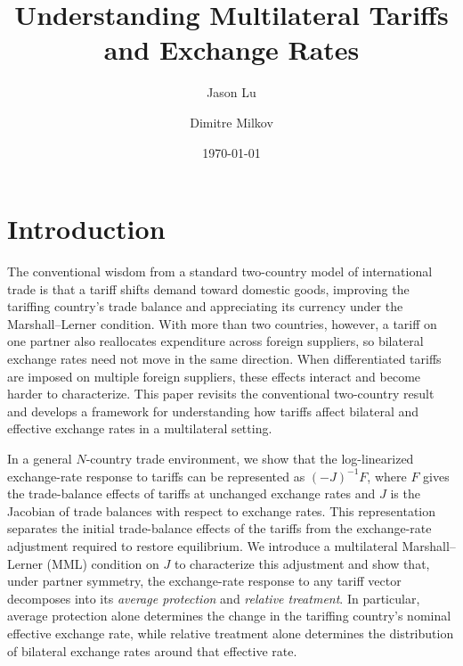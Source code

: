 \documentclass[11pt]{article}
\title{Understanding Multilateral Tariffs and Exchange Rates}
\author{Jason Lu \and Dimitre Milkov}
\date{\today}
\begin{document}
\maketitle

\section{Introduction}

The conventional wisdom from a standard two-country model of international trade is that a tariff shifts demand toward domestic goods, improving the tariffing country's trade balance and appreciating its currency under the Marshall--Lerner condition. With more than two countries, however, a tariff on one partner also reallocates expenditure across foreign suppliers, so bilateral exchange rates need not move in the same direction. When differentiated tariffs are imposed on multiple foreign suppliers, these effects interact and become harder to characterize. This paper revisits the conventional two-country result and develops a framework for understanding how tariffs affect bilateral and effective exchange rates in a multilateral setting.

In a general $N$-country trade environment, we show that the log-linearized exchange-rate response to tariffs can be represented as $(-J)^{-1}F$, where $F$ gives the trade-balance effects of tariffs at unchanged exchange rates and $J$ is the Jacobian of trade balances with respect to exchange rates. This representation separates the initial trade-balance effects of the tariffs from the exchange-rate adjustment required to restore equilibrium. We introduce a multilateral Marshall--Lerner (MML) condition on $J$ to characterize this adjustment and show that, under partner symmetry, the exchange-rate response to any tariff vector decomposes into its \emph{average protection} and \emph{relative treatment}. In particular, average protection alone determines the change in the tariffing country's nominal effective exchange rate, while relative treatment alone determines the distribution of bilateral exchange rates around that effective rate.
\end{document}
